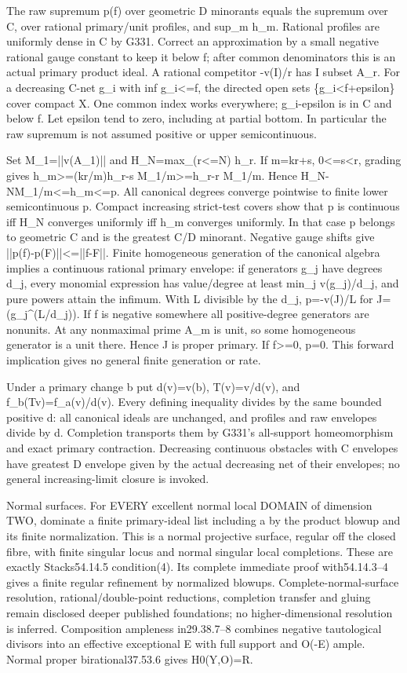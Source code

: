 \documentclass[11pt]{article}
\begin{document}
The raw supremum p(f) over geometric D minorants equals the supremum over C, over rational primary/unit profiles, and sup\_m h\_m. Rational profiles are uniformly dense in C by G331. Correct an approximation by a small negative rational gauge constant to keep it below f; after common denominators this is an actual primary product ideal. A rational competitor -v(I)/r has I subset A\_r. For a decreasing C-net g\_i with inf g\_i\textless{}=f, the directed open sets \{g\_i\textless{}f+epsilon\} cover compact X. One common index works everywhere; g\_i-epsilon is in C and below f. Let epsilon tend to zero, including at partial bottom. In particular the raw supremum is not assumed positive or upper semicontinuous.

Set M\_1=||v(A\_1)|| and H\_N=max\_(r\textless{}=N) h\_r. If m=kr+s, 0\textless{}=s\textless{}r, grading gives h\_m\textgreater{}=(kr/m)h\_r-s M\_1/m\textgreater{}=h\_r-r M\_1/m. Hence H\_N-NM\_1/m\textless{}=h\_m\textless{}=p. All canonical degrees converge pointwise to finite lower semicontinuous p. Compact increasing strict-test covers show that p is continuous iff H\_N converges uniformly iff h\_m converges uniformly. In that case p belongs to geometric C and is the greatest C/D minorant. Negative gauge shifts give ||p(f)-p(F)||\textless{}=||f-F||. Finite homogeneous generation of the canonical algebra implies a continuous rational primary envelope: if generators g\_j have degrees d\_j, every monomial expression has value/degree at least min\_j v(g\_j)/d\_j, and pure powers attain the infimum. With L divisible by the d\_j, p=-v(J)/L for J=(g\_j\textasciicircum{}(L/d\_j)). If f is negative somewhere all positive-degree generators are nonunits. At any nonmaximal prime A\_m is unit, so some homogeneous generator is a unit there. Hence J is proper primary. If f\textgreater{}=0, p=0. This forward implication gives no general finite generation or rate.

Under a primary change b put d(v)=v(b), T(v)=v/d(v), and f\_b(Tv)=f\_a(v)/d(v). Every defining inequality divides by the same bounded positive d: all canonical ideals are unchanged, and profiles and raw envelopes divide by d. Completion transports them by G331's all-support homeomorphism and exact primary contraction. Decreasing continuous obstacles with C envelopes have greatest D envelope given by the actual decreasing net of their envelopes; no general increasing-limit closure is invoked.

Normal surfaces. For EVERY excellent normal local DOMAIN of dimension TWO, dominate a finite primary-ideal list including a by the product blowup and its finite normalization. This is a normal projective surface, regular off the closed fibre, with finite singular locus and normal singular local completions. These are exactly Stacks54.14.5 condition(4). Its complete immediate proof with54.14.3--4 gives a finite regular refinement by normalized blowups. Complete-normal-surface resolution, rational/double-point reductions, completion transfer and gluing remain disclosed deeper published foundations; no higher-dimensional resolution is inferred. Composition ampleness in29.38.7--8 combines negative tautological divisors into an effective exceptional E with full support and O(-E) ample. Normal proper birational37.53.6 gives H0(Y,O)=R.
\end{document}
